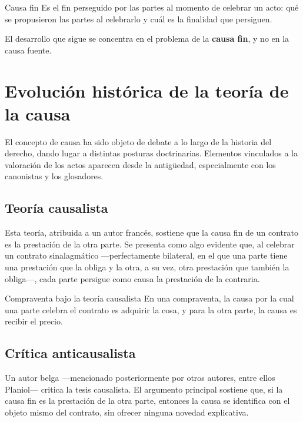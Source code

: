 \documentclass[12pt,oneside]{book}
\begin{document}
\begin{definition}{Causa fin}
Es el fin perseguido por las partes al momento de celebrar un acto: qué se propusieron las partes al celebrarlo y cuál es la finalidad que persiguen.
\end{definition}

El desarrollo que sigue se concentra en el problema de la \textbf{causa fin}, y no en la causa fuente.

\section{Evolución histórica de la teoría de la causa}

El concepto de causa ha sido objeto de debate a lo largo de la historia del derecho, dando lugar a distintas posturas doctrinarias. Elementos vinculados a la valoración de los actos aparecen desde la antigüedad, especialmente con los canonistas y los glosadores.

\subsection{Teoría causalista}

Esta teoría, atribuida a un autor francés, sostiene que la causa fin de un contrato es la prestación de la otra parte. Se presenta como algo evidente que, al celebrar un contrato sinalagmático —perfectamente bilateral, en el que una parte tiene una prestación que la obliga y la otra, a su vez, otra prestación que también la obliga—, cada parte persigue como causa la prestación de la contraria.

\begin{example}{Compraventa bajo la teoría causalista}
En una compraventa, la causa por la cual una parte celebra el contrato es adquirir la cosa, y para la otra parte, la causa es recibir el precio.
\end{example}

\subsection{Crítica anticausalista}

Un autor belga —mencionado posteriormente por otros autores, entre ellos Planiol— critica la tesis causalista. El argumento principal sostiene que, si la causa fin es la prestación de la otra parte, entonces la causa se identifica con el objeto mismo del contrato, sin ofrecer ninguna novedad explicativa.
\end{document}
